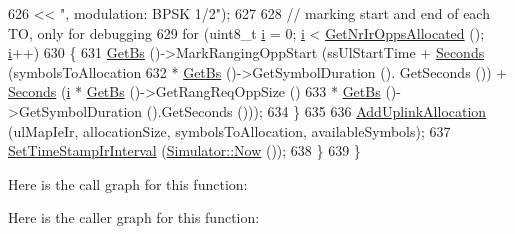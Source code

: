 \begin{DoxyCode}
626                                                                               << \textcolor{stringliteral}{", modulation: BPSK 1/2"});
627 
628       \textcolor{comment}{// marking start and end of each TO, only for debugging}
629       \textcolor{keywordflow}{for} (uint8\_t \hyperlink{bernuolliDistribution_8m_a6f6ccfcf58b31cb6412107d9d5281426}{i} = 0; \hyperlink{bernuolliDistribution_8m_a6f6ccfcf58b31cb6412107d9d5281426}{i} < \hyperlink{classns3_1_1UplinkScheduler_a9a2cbb04c1e84a028fc1545e8f054b80}{GetNrIrOppsAllocated} (); \hyperlink{bernuolliDistribution_8m_a6f6ccfcf58b31cb6412107d9d5281426}{i}++)
630         \{
631           \hyperlink{classns3_1_1UplinkScheduler_afe61b7de71d92d2dff1b135744a6ff7e}{GetBs} ()->MarkRangingOppStart (ssUlStartTime + \hyperlink{group__timecivil_ga33c34b816f8ff6628e33d5c8e9713b9e}{Seconds} (symbolsToAllocation
632                                                                   * \hyperlink{classns3_1_1UplinkScheduler_afe61b7de71d92d2dff1b135744a6ff7e}{GetBs} ()->GetSymbolDuration ().
      GetSeconds ()) + \hyperlink{group__timecivil_ga33c34b816f8ff6628e33d5c8e9713b9e}{Seconds} (\hyperlink{bernuolliDistribution_8m_a6f6ccfcf58b31cb6412107d9d5281426}{i} * \hyperlink{classns3_1_1UplinkScheduler_afe61b7de71d92d2dff1b135744a6ff7e}{GetBs} ()->GetRangReqOppSize ()
633                                                                                                            
                        * \hyperlink{classns3_1_1UplinkScheduler_afe61b7de71d92d2dff1b135744a6ff7e}{GetBs} ()->GetSymbolDuration ().GetSeconds ()));
634         \}
635 
636       \hyperlink{classns3_1_1UplinkSchedulerRtps_aea8d8f5701bf3b5f992d1b43471340d2}{AddUplinkAllocation} (ulMapIeIr, allocationSize, symbolsToAllocation, 
      availableSymbols);
637       \hyperlink{classns3_1_1UplinkScheduler_ad6e89aef6cf4a9d485762f8bd08ec24e}{SetTimeStampIrInterval} (\hyperlink{classns3_1_1Simulator_ac3178fa975b419f7875e7105be122800}{Simulator::Now} ());
638     \}
639 \}
\end{DoxyCode}


Here is the call graph for this function\+:




Here is the caller graph for this function\+:


